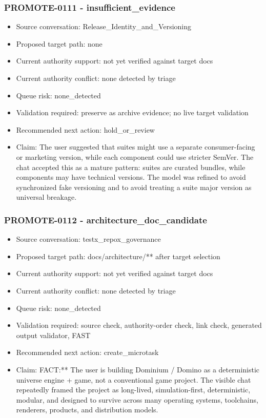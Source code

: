 \documentclass[11pt,a4paper]{report}
\begin{document}
\subsubsection{PROMOTE-0111 - insufficient\_evidence}

\begin{itemize}
\item Source conversation: Release\_Identity\_and\_Versioning
\item Proposed target path: none
\item Current authority support: not yet verified against target docs
\item Current authority conflict: none detected by triage
\item Queue risk: none\_detected
\item Validation required: preserve as archive evidence; no live target validation
\item Recommended next action: hold\_or\_review
\item Claim: The user suggested that suites might use a separate consumer-facing or marketing version, while each component could use stricter SemVer. The chat accepted this as a mature pattern: suites are curated bundles, while components may have technical versions. The model was refined to avoid synchronized fake versioning and to avoid treating a suite major version as universal breakage.
\end{itemize}

\subsubsection{PROMOTE-0112 - architecture\_doc\_candidate}

\begin{itemize}
\item Source conversation: testx\_repox\_governance
\item Proposed target path: docs/architecture/** after target selection
\item Current authority support: not yet verified against target docs
\item Current authority conflict: none detected by triage
\item Queue risk: none\_detected
\item Validation required: source check, authority-order check, link check, generated output validator, FAST
\item Recommended next action: create\_microtask
\item Claim: FACT:** The user is building Dominium / Domino as a deterministic universe engine + game, not a conventional game project. The visible chat repeatedly framed the project as long-lived, simulation-first, deterministic, modular, and designed to survive across many operating systems, toolchains, renderers, products, and distribution models.
\end{itemize}
\end{document}
